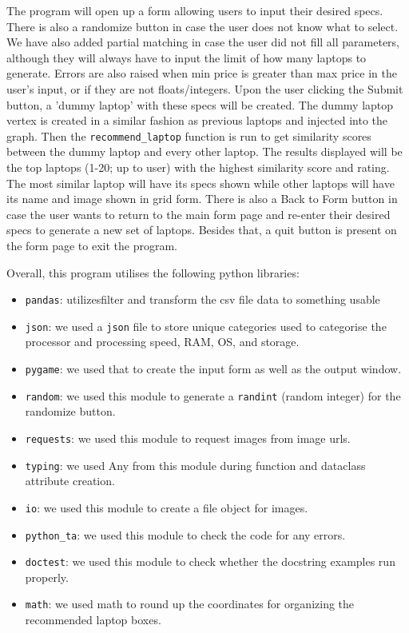 \documentclass{article}
\begin{document}
The program will open up a form allowing users to input their desired specs. There is also a randomize button in case the user does not know what to select. We have also added partial matching in case the user did not fill all parameters, although they will always have to input the limit of how many laptops to generate. Errors are also raised when min price is greater than max price in the user's input, or if they are not floats/integers. Upon the user clicking the Submit button, a 'dummy laptop' with these specs will be created. The dummy laptop vertex is created in a similar fashion as previous laptops and injected into the graph. Then the \texttt{recommend\_laptop} function is run to get similarity scores between the dummy laptop and every other laptop. The results displayed will be the top laptops (1-20; up to user) with the highest similarity score and rating. The most similar laptop will have its specs shown while other laptops will have its name and image shown in grid form. There is also a Back to Form button in case the user wants to return to the main form page and re-enter their desired specs to generate a new set of laptops. Besides that, a quit button is present on the form page to exit the program.
\\
\par
Overall, this program utilises the following python libraries:
\begin{itemize}
    \item \texttt{pandas}: utilizesfilter and transform the csv file data to something usable
    \item \texttt{json}: we used a \texttt{json} file to store unique categories used to categorise the processor and processing speed, RAM, OS, and storage.
    \item \texttt{pygame}: we used that to create the input form as well as the output window.
    \item \texttt{random}: we used this module to generate a \texttt{randint} (random integer) for the randomize button.
    \item \texttt{requests}: we used this module to request images from image urls.
    \item \texttt{typing}: we used Any from this module during function and dataclass attribute creation.
    \item \texttt{io}: we used this module to create a file object for images.
    \item \texttt{python\_ta}: we used this module to check the code for any errors.
    \item \texttt{doctest}: we used this module to check whether the docstring examples run properly.
    \item \texttt{math}: we used math to round up the coordinates for organizing the recommended laptop boxes.
\end{itemize}
\end{document}
